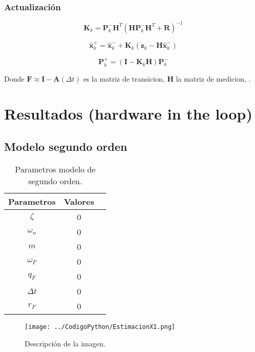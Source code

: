 \documentclass[conference]{IEEEtran}
\begin{document}
\subsubsection{Actualizaci\'on}

\[
\mathbf{K}_k = \mathbf{P}_k^- \mathbf{H}^T \left( \mathbf{H} \mathbf{P}_k^- \mathbf{H}^T + \mathbf{R} \right)^{-1}
\]

\[
\hat{\mathbf{x}}_k^+ = \hat{\mathbf{x}}_k^- + \mathbf{K}_k \left( \mathbf{z}_k - \mathbf{H} \hat{\mathbf{x}}_k^- \right)
\]

\[
\mathbf{P}_k^+ = \left( \mathbf{I} - \mathbf{K}_k \mathbf{H} \right) \mathbf{P}_k^-
\]

Donde $\mathbf{F}\approx \mathbf{I} - \mathbf{A}(\Delta t) $ es la matriz de transicion, $\mathbf{H}$  la matriz de medicion, .





\section{Resultados (hardware in the loop)}

\subsection{Modelo segundo orden}

\begin{table}[h]
	\centering
	\caption{Parametros modelo de segundo orden.}
	\label{tab:parametros_segundo_orden}
	\begin{tabular}{|c|c|c|}
		\hline
		\textbf{Parametros} & \textbf{Valores} \\
		\hline
		$\zeta$  &  0 \\
		$\omega_n$      & 0 \\
		$m$ & 0 \\
		$\omega_F$ & 0 \\
		$ q_F $  &  0\\
		$\Delta t$ & 0\\  
		$r_F$ & 0 \\ 
		\hline
	\end{tabular}
	
\end{table}




\begin{figure}[h]
	\centering
	\texttt{[image: ../CodigoPython/EstimacionX1.png]}
	\caption{Descripción de la imagen.}
	\label{fig:etiqueta}
\end{figure}
\end{document}
